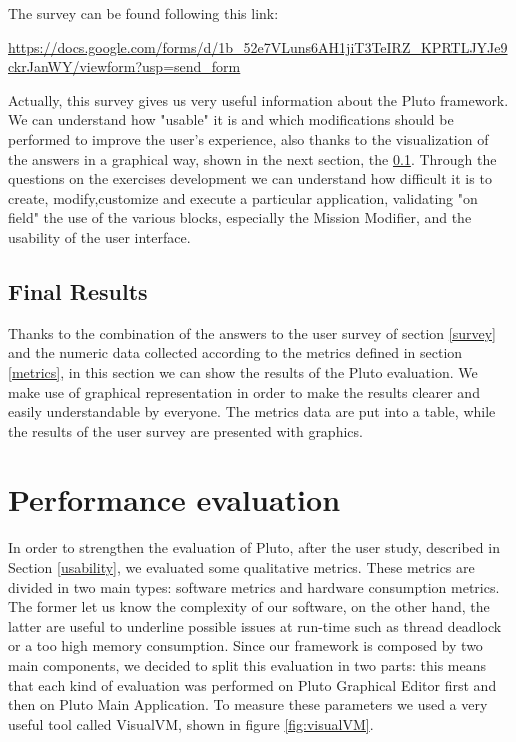 The survey can be found following this link:

\url{https://docs.google.com/forms/d/1b_52e7VLuns6AH1jiT3TeIRZ_KPRTLJYJe9ckrJanWY/viewform?usp=send_form}


Actually, this survey gives us very useful information about the Pluto framework. We can understand how "usable" it is and which modifications should be performed to improve the user's experience, also thanks to the visualization of the answers in a graphical way, shown in the next section, the \ref{surveyResult}.
Through the questions on the exercises development we can understand how difficult it is to create, modify,customize and execute a particular application, validating "on field" the use of the various blocks, especially the Mission Modifier, and the usability of the user interface.

\subsection{Final Results}\label{surveyResult}

Thanks to the combination of the answers to the user survey of section \ref{survey} and the numeric data collected according to the metrics defined in section \ref{metrics}, in this section we can show the results of the Pluto evaluation.
We make use of graphical representation in order to make the results clearer and easily understandable by everyone.
The metrics data are put into a table, while the results of the user survey are presented with graphics.





\newpage

\section{Performance evaluation}\label{performance}

In order to strengthen the evaluation of Pluto, after the user study, described in Section \ref{usability}, we evaluated some qualitative metrics. These metrics are divided in two main types: software metrics and hardware consumption metrics. The former let us know the complexity of our software, on the other hand, the latter are useful to underline possible issues at run-time such as thread deadlock or a too high memory consumption.
Since our framework is composed by two main components, we decided to split this evaluation in two parts: this means that each kind of evaluation was performed on Pluto Graphical Editor first and then on Pluto Main Application.
To measure these parameters we used a very useful tool called VisualVM, shown in figure \ref{fig:visualVM}. 

